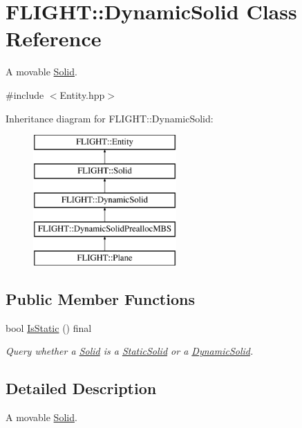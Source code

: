 \hypertarget{class_f_l_i_g_h_t_1_1_dynamic_solid}{}\section{F\+L\+I\+G\+HT\+:\+:Dynamic\+Solid Class Reference}
\label{class_f_l_i_g_h_t_1_1_dynamic_solid}


A movable \hyperlink{class_f_l_i_g_h_t_1_1_solid}{Solid}.  




{\ttfamily \#include $<$Entity.\+hpp$>$}

Inheritance diagram for F\+L\+I\+G\+HT\+:\+:Dynamic\+Solid\+:\begin{figure}[H]
\begin{center}
\leavevmode
\includegraphics[height=5.000000cm]{class_f_l_i_g_h_t_1_1_dynamic_solid}
\end{center}
\end{figure}
\subsection*{Public Member Functions}
\begin{DoxyCompactItemize}
\item 
bool \hyperlink{class_f_l_i_g_h_t_1_1_dynamic_solid_a39451b0ef449a343cf5f9c12e3f79ba3}{Is\+Static} () final
\begin{DoxyCompactList}\small\item\em Query whether a \hyperlink{class_f_l_i_g_h_t_1_1_solid}{Solid} is a \hyperlink{class_f_l_i_g_h_t_1_1_static_solid}{Static\+Solid} or a \hyperlink{class_f_l_i_g_h_t_1_1_dynamic_solid}{Dynamic\+Solid}. \end{DoxyCompactList}\end{DoxyCompactItemize}


\subsection{Detailed Description}
A movable \hyperlink{class_f_l_i_g_h_t_1_1_solid}{Solid}. 

